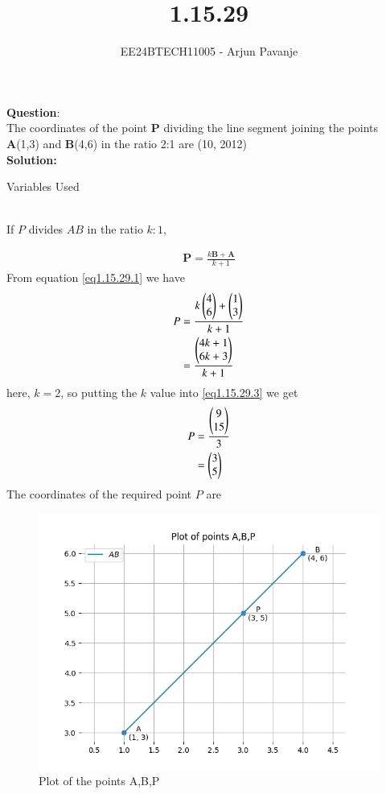 \documentclass[journal]{IEEEtran}
\begin{document}

\vspace{3cm}

\title{1.15.29}
\author{EE24BTECH11005 - Arjun Pavanje
}
{\let\newpage\relax\maketitle}

\textbf{Question}:\\
The coordinates of the point \textbf{P} dividing the line segment joining the points \textbf{A}(1,3) and \textbf{B}(4,6) in the ratio 2:1 are
\hfill (10, 2012)
\\
\textbf{Solution: }
\begin{table}[h!]    
  \centering
  
  \caption{Variables Used}
  \label{tab1.15.29}
\end{table}\\
If $P$ divides $AB$ in the ratio $k:1$,


\begin{align} 
\textbf{P}=\frac{k\textbf{B}+\textbf{A}}{k+1} \label{eq1.15.29.1}
\end{align}
From equation \ref{eq1.15.29.1} we have
\begin{align}
P &= \frac{k
\begin{pmatrix}
4\\
6\end{pmatrix} +
\begin{pmatrix}
1\\
3\end{pmatrix}}{k+1} \label{eq1.15.29.2}\\
&= \frac{
\begin{pmatrix}
4k+1 \\
6k+3
\end{pmatrix}}{k+1} \label{eq1.15.29.3}
\end{align}
here, $k = 2$, so putting the $k$ value into \ref{eq1.15.29.3} we get
\begin{align}
P &= \frac{
\begin{pmatrix}
9\\
15
\end{pmatrix}}{3} \label{eq1.15.29.4}\\
&=
\begin{pmatrix}
3\\
5
	\end{pmatrix} \label{eq1.15.29.5}
\end{align}
The coordinates of the required point $P$ are
\begin{figure}[h!]
   \centering
   \includegraphics[width=0.7\linewidth]{figs/Figure_1.png}
   \caption{Plot of the points A,B,P}
   \label{stemplot}
\end{figure}
\end{document}
